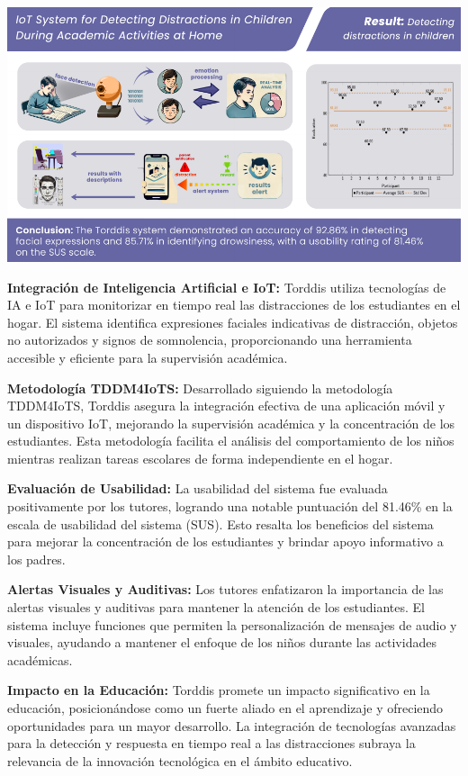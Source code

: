 \documentclass[a4paper,fleqn]{cas-sc}
\begin{document}
	\begin{graphicalabstract}
		\includegraphics{figs/cas-grabs.pdf}
	\end{graphicalabstract}
	
	\begin{highlights}
		\item \textbf{Integración de Inteligencia Artificial e IoT:} Torddis utiliza tecnologías de IA e IoT para monitorizar en tiempo real las distracciones de los estudiantes en el hogar. El sistema identifica expresiones faciales indicativas de distracción, objetos no autorizados y signos de somnolencia, proporcionando una herramienta accesible y eficiente para la supervisión académica.
		\item \textbf{Metodología TDDM4IoTS:} Desarrollado siguiendo la metodología TDDM4IoTS, Torddis asegura la integración efectiva de una aplicación móvil y un dispositivo IoT, mejorando la supervisión académica y la concentración de los estudiantes. Esta metodología facilita el análisis del comportamiento de los niños mientras realizan tareas escolares de forma independiente en el hogar.
		\item \textbf{Evaluación de Usabilidad:} La usabilidad del sistema fue evaluada positivamente por los tutores, logrando una notable puntuación del 81.46\% en la escala de usabilidad del sistema (SUS). Esto resalta los beneficios del sistema para mejorar la concentración de los estudiantes y brindar apoyo informativo a los padres.
		\item \textbf{Alertas Visuales y Auditivas:} Los tutores enfatizaron la importancia de las alertas visuales y auditivas para mantener la atención de los estudiantes. El sistema incluye funciones que permiten la personalización de mensajes de audio y visuales, ayudando a mantener el enfoque de los niños durante las actividades académicas.
		\item \textbf{Impacto en la Educación:} Torddis promete un impacto significativo en la educación, posicionándose como un fuerte aliado en el aprendizaje y ofreciendo oportunidades para un mayor desarrollo. La integración de tecnologías avanzadas para la detección y respuesta en tiempo real a las distracciones subraya la relevancia de la innovación tecnológica en el ámbito educativo.
	\end{highlights}
	
\end{document}
